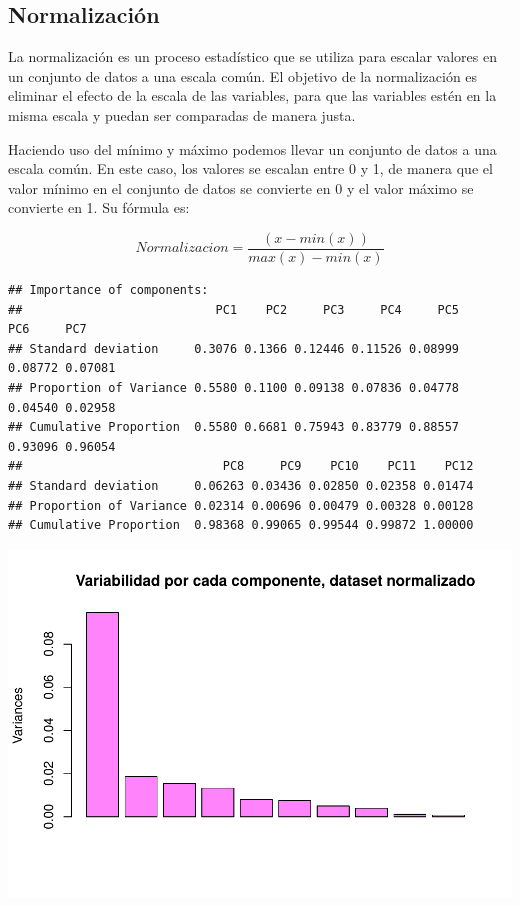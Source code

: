 \documentclass[
]{article}
\begin{document}
\hypertarget{normalizaciuxf3n}{%
\subsection{Normalización}\label{normalizaciuxf3n}}

La normalización es un proceso estadístico que se utiliza para escalar
valores en un conjunto de datos a una escala común. El objetivo de la
normalización es eliminar el efecto de la escala de las variables, para
que las variables estén en la misma escala y puedan ser comparadas de
manera justa.

Haciendo uso del mínimo y máximo podemos llevar un conjunto de datos a
una escala común. En este caso, los valores se escalan entre 0 y 1, de
manera que el valor mínimo en el conjunto de datos se convierte en 0 y
el valor máximo se convierte en 1. Su fórmula es:

\[Normalizacion=\frac{(x-min(x))}{max(x)-min(x)}\]

\begin{verbatim}
## Importance of components:
##                           PC1    PC2     PC3     PC4     PC5     PC6     PC7
## Standard deviation     0.3076 0.1366 0.12446 0.11526 0.08999 0.08772 0.07081
## Proportion of Variance 0.5580 0.1100 0.09138 0.07836 0.04778 0.04540 0.02958
## Cumulative Proportion  0.5580 0.6681 0.75943 0.83779 0.88557 0.93096 0.96054
##                            PC8     PC9    PC10    PC11    PC12
## Standard deviation     0.06263 0.03436 0.02850 0.02358 0.01474
## Proportion of Variance 0.02314 0.00696 0.00479 0.00328 0.00128
## Cumulative Proportion  0.98368 0.99065 0.99544 0.99872 1.00000
\end{verbatim}

\includegraphics{AMTV_Docum_Consolidado_files/figure-latex/unnamed-chunk-11-1.pdf}
\end{document}
